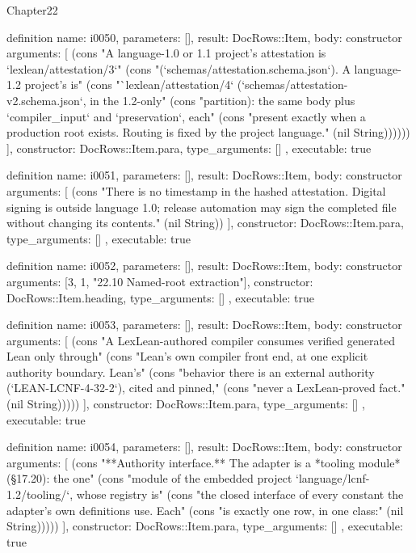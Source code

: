 \begin{lexlean}{Chapter22}
\begin{semanticmodule}
definition{
  name: i0050,
  parameters: [],
  result: DocRows::Item,
  body: constructor{
    arguments: [
      (cons "A language-1.0 or 1.1 project's attestation is `lexlean/attestation/3`" (cons "(`schemas/attestation.schema.json`). A language-1.2 project's is" (cons "`lexlean/attestation/4` (`schemas/attestation-v2.schema.json`, in the 1.2-only" (cons "partition): the same body plus `compiler_input` and `preservation`, each" (cons "present exactly when a production root exists. Routing is fixed by the project language." (nil String))))))
    ],
    constructor: DocRows::Item.para,
    type_arguments: []
  },
  executable: true
}

definition{
  name: i0051,
  parameters: [],
  result: DocRows::Item,
  body: constructor{
    arguments: [
      (cons "There is no timestamp in the hashed attestation. Digital signing is outside language 1.0; release automation may sign the completed file without changing its contents." (nil String))
    ],
    constructor: DocRows::Item.para,
    type_arguments: []
  },
  executable: true
}

definition{
  name: i0052,
  parameters: [],
  result: DocRows::Item,
  body: constructor{
    arguments: [3, 1, "22.10 Named-root extraction"],
    constructor: DocRows::Item.heading,
    type_arguments: []
  },
  executable: true
}

definition{
  name: i0053,
  parameters: [],
  result: DocRows::Item,
  body: constructor{
    arguments: [
      (cons "A LexLean-authored compiler consumes verified generated Lean only through" (cons "Lean's own compiler front end, at one explicit authority boundary. Lean's" (cons "behavior there is an external authority (`LEAN-LCNF-4-32-2`), cited and pinned," (cons "never a LexLean-proved fact." (nil String)))))
    ],
    constructor: DocRows::Item.para,
    type_arguments: []
  },
  executable: true
}

definition{
  name: i0054,
  parameters: [],
  result: DocRows::Item,
  body: constructor{
    arguments: [
      (cons "**Authority interface.** The adapter is a *tooling module* (§17.20): the one" (cons "module of the embedded project `language/lcnf-1.2/tooling/`, whose registry is" (cons "the closed interface of every constant the adapter's own definitions use. Each" (cons "is exactly one row, in one class:" (nil String)))))
    ],
    constructor: DocRows::Item.para,
    type_arguments: []
  },
  executable: true
}


\end{semanticmodule}
\end{lexlean}
